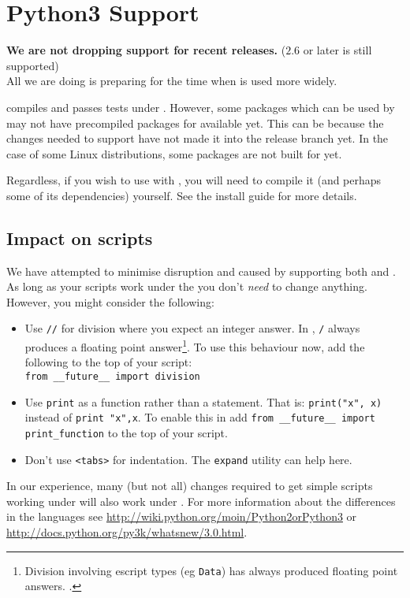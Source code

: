 \chapter{Python3 Support}\label{app:py3}

\textbf{We are not dropping support for recent \pythontwo releases.} ($2.6$ or later is still supported) \\
All we are doing is preparing for the time when \pythonthree is used more widely.

\escript compiles and passes tests under \pythonthree.
However, some packages which can be used by \escript may not have precompiled packages for \pythonthree available yet.
This can be because the changes needed to support \pythonthree have not made it into the 
release branch yet. 
In the case of some Linux distributions, some packages are not built for \pythonthree yet.

Regardless, if you wish to use \escript with \pythonthree, you will need to compile it (and perhaps some of
its dependencies) yourself.
See the install guide for more details. 

\section{Impact on scripts}
We have attempted to minimise disruption and caused by supporting both \pythontwo and \pythonthree.
As long as your scripts work under the \pythontwo you don't \emph{need} to change anything.
However, you might consider the following:
\begin{itemize}
 \item Use \texttt{//} for division where you expect an integer answer. 
In \pythonthree, \texttt{/} always produces a floating point answer\footnote{Division involving escript types (eg \texttt{Data}) has always produced floating point answers. 
.}.
To use this behaviour now, add the following to the top of your script:\\
\texttt{from __future__ import division}
\item Use \texttt{print} as a function rather than a statement.
That is:  \texttt{print("x", x)}  instead of \texttt{print "x",x}.
To enable this in \pythontwo add \texttt{from __future__ import print_function} to the top of your script.
\item{Don't use \verb|<tabs>| for indentation.  The \texttt{expand} utility can help here.}
\end{itemize}

In our experience, many (but not all) changes required to get simple scripts working under \pythonthree will also
work under \pythontwo.
For more information about the differences in the languages see \url{http://wiki.python.org/moin/Python2orPython3} 
or \url{http://docs.python.org/py3k/whatsnew/3.0.html}.